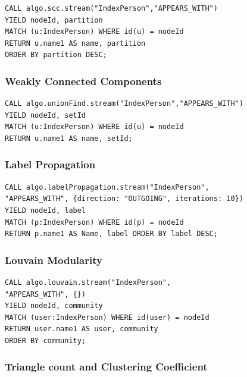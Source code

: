 \begin{verbatim}
CALL algo.scc.stream("IndexPerson","APPEARS_WITH")
YIELD nodeId, partition
MATCH (u:IndexPerson) WHERE id(u) = nodeId
RETURN u.name1 AS name, partition
ORDER BY partition DESC;
\end{verbatim}

\hypertarget{weakly-connected-components}{%
\subsubsection{Weakly Connected
Components}\label{weakly-connected-components}}

\begin{verbatim}
CALL algo.unionFind.stream("IndexPerson","APPEARS_WITH")
YIELD nodeId, setId
MATCH (u:IndexPerson) WHERE id(u) = nodeId
RETURN u.name1 AS name, setId;
\end{verbatim}

\hypertarget{label-propagation}{%
\subsubsection{Label Propagation}\label{label-propagation}}

\begin{verbatim}
CALL algo.labelPropagation.stream("IndexPerson",
"APPEARS_WITH", {direction: "OUTGOING", iterations: 10})
YIELD nodeId, label
MATCH (p:IndexPerson) WHERE id(p) = nodeId
RETURN p.name1 AS Name, label ORDER BY label DESC;
\end{verbatim}

\hypertarget{louvain-modularity}{%
\subsubsection{Louvain Modularity}\label{louvain-modularity}}

\begin{verbatim}
CALL algo.louvain.stream("IndexPerson",
"APPEARS_WITH", {})
YIELD nodeId, community
MATCH (user:IndexPerson) WHERE id(user) = nodeId
RETURN user.name1 AS user, community
ORDER BY community;
\end{verbatim}

\hypertarget{triangle-count-and-clustering-coefficient}{%
\subsubsection{Triangle count and Clustering
Coefficient}\label{triangle-count-and-clustering-coefficient}}

